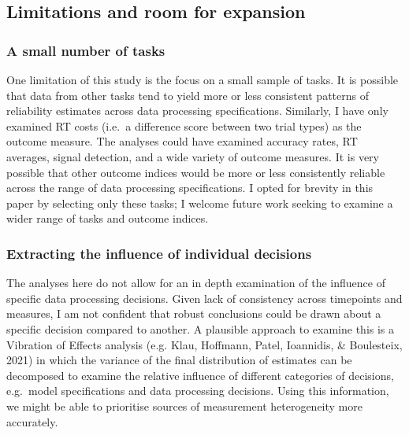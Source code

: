 \documentclass[
  english,
  man,floatsintext]{apa6}
\begin{document}
\hypertarget{limitations-and-room-for-expansion}{%
\subsection{Limitations and room for expansion}\label{limitations-and-room-for-expansion}}

\hypertarget{a-small-number-of-tasks}{%
\subsubsection{A small number of tasks}\label{a-small-number-of-tasks}}

One limitation of this study is the focus on a small sample of tasks. It is possible that data from other tasks tend to yield more or less consistent patterns of reliability estimates across data processing specifications. Similarly, I have only examined RT costs (i.e.~a difference score between two trial types) as the outcome measure. The analyses could have examined accuracy rates, RT averages, signal detection, and a wide variety of outcome measures. It is very possible that other outcome indices would be more or less consistently reliable across the range of data processing specifications. I opted for brevity in this paper by selecting only these tasks; I welcome future work seeking to examine a wider range of tasks and outcome indices.

\hypertarget{extracting-the-influence-of-individual-decisions}{%
\subsubsection{Extracting the influence of individual decisions}\label{extracting-the-influence-of-individual-decisions}}

The analyses here do not allow for an in depth examination of the influence of specific data processing decisions. Given lack of consistency across timepoints and measures, I am not confident that robust conclusions could be drawn about a specific decision compared to another. A plausible approach to examine this is a Vibration of Effects analysis (e.g. Klau, Hoffmann, Patel, Ioannidis, \& Boulesteix, 2021) in which the variance of the final distribution of estimates can be decomposed to examine the relative influence of different categories of decisions, e.g.~model specifications and data processing decisions. Using this information, we might be able to prioritise sources of measurement heterogeneity more accurately.
\end{document}
